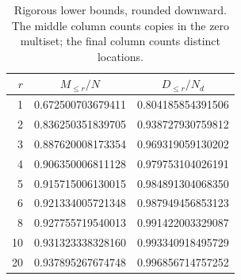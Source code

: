 \begin{table}[ht]
\centering
\caption{Rigorous lower bounds, rounded downward.  The middle column counts copies in the zero multiset; the final column counts distinct locations.}
\label{tab:values}
\begin{tabular}{@{}rcc@{}}
\toprule
$r$ & $M_{\leq r}/N$ & $D_{\leq r}/N_d$\\
\midrule
1 & 0.672500703679411 & 0.804185854391506\\
2 & 0.836250351839705 & 0.938727930759812\\
3 & 0.887620008173354 & 0.969319059130202\\
4 & 0.906350006811128 & 0.979753104026191\\
5 & 0.915715006130015 & 0.984891304068350\\
6 & 0.921334005721348 & 0.987949456853123\\
8 & 0.927755719540013 & 0.991422003329087\\
10& 0.931323338328160 & 0.993340918495729\\
20& 0.937895267674748 & 0.996856714757252\\
\bottomrule
\end{tabular}
\end{table}

